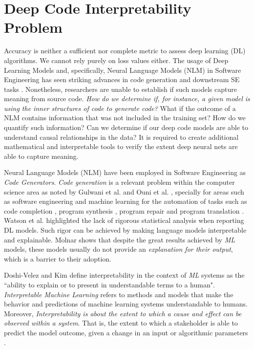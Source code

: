 \section{Deep Code Interpretability Problem}
\label{sec:deep-interpret-problem}

Accuracy is neither a sufficient nor complete metric to assess deep learning (DL) algorithms. We cannot rely purely on loss values either. The usage of Deep Learning Models and, specifically, Neural Language Models (NLM) in Software Engineering has seen striking advances in code generation and downstream SE tasks \citep{Chen2021EvaluatingCode,Watson2020}. Nonetheless, researchers are unable to establish if such models capture meaning from source code.  \textit{How do we determine if, for instance, a given model is using the inner structures of code to generate code?} What if the outcome of a NLM contains information that was not included in the training set? How do we quantify such information? Can we determine if our deep code models are able to understand causal relationships in the data?  It is required to create additional mathematical and interpretable tools to verify the extent deep neural nets are able to capture meaning. 

Neural Language Models (NLM) have been employed in Software Engineering as \textit{Code Generators}. \textit{Code generation} is a relevant problem within the computer science area as noted by Gulwani et al. \citep{Gulwani2017} and Ouni et al. \citep{Ouni2017}, specially for areas such as software engineering and  machine learning for the automation of tasks such as code completion \citep{Nguyen2013}, program synthesis \citep{Gulwani2017}, program repair \cite{Chen2019} and program translation \citep{Aggarwal2015}. Watson et al. \citep{Watson2020}  highlighted the lack of rigorous statistical analysis when reporting DL models. Such rigor can be achieved by making language models interpretable and explainable. Molnar \citep{Molnar2019} shows that despite the great results achieved by \textit{ML} models, these models usually do not provide an \textit{explanation for their output}, which is a barrier to their adoption.

Doshi-Velez and Kim \citep{Doshi-Velez} define interpretability in the context of \textit{ML} systems as the ``ability to explain or to present in understandable terms to a human". \textit{Interpretable Machine Learning} refers to methods and models that make the behavior and predictions of machine learning systems understandable to humans. Moreover, \textit{Interpretability is about the extent to which a cause and effect can be observed within a system}. That is, the extent to which a stakeholder is able to predict the model outcome, given a change in an input or algorithmic parameters \citep{Molnar2019}.